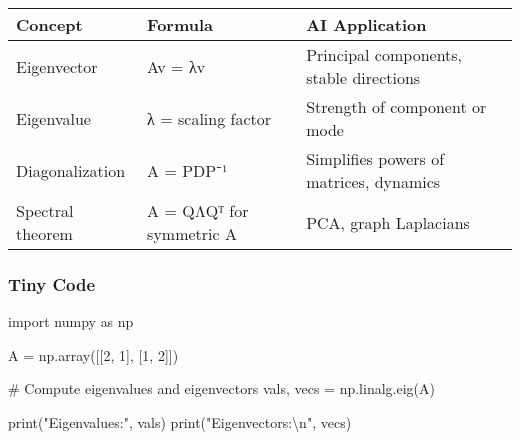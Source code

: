 \documentclass[
  letterpaper,
  DIV=11,
  numbers=noendperiod]{scrreprt}
\newenvironment{Shaded}{\begin{snugshade}}{\end{snugshade}}
\newcommand{\BuiltInTok}[1]{\textcolor[rgb]{0.00,0.23,0.31}{#1}}
\newcommand{\CharTok}[1]{\textcolor[rgb]{0.13,0.47,0.30}{#1}}
\newcommand{\CommentTok}[1]{\textcolor[rgb]{0.37,0.37,0.37}{#1}}
\newcommand{\DecValTok}[1]{\textcolor[rgb]{0.68,0.00,0.00}{#1}}
\newcommand{\ImportTok}[1]{\textcolor[rgb]{0.00,0.46,0.62}{#1}}
\newcommand{\NormalTok}[1]{\textcolor[rgb]{0.00,0.23,0.31}{#1}}
\newcommand{\OperatorTok}[1]{\textcolor[rgb]{0.37,0.37,0.37}{#1}}
\newcommand{\StringTok}[1]{\textcolor[rgb]{0.13,0.47,0.30}{#1}}
\begin{document}
\begin{longtable}[]{@{}
  >{\raggedright\arraybackslash}p{}
  >{\raggedright\arraybackslash}p{}
  >{\raggedright\arraybackslash}p{}@{}}
\toprule\noalign{}
\begin{minipage}[b]{\linewidth}\raggedright
Concept
\end{minipage} & \begin{minipage}[b]{\linewidth}\raggedright
Formula
\end{minipage} & \begin{minipage}[b]{\linewidth}\raggedright
AI Application
\end{minipage} \\
\midrule\noalign{}
\endhead
\bottomrule\noalign{}
\endlastfoot
Eigenvector & Av = λv & Principal components, stable directions \\
Eigenvalue & λ = scaling factor & Strength of component or mode \\
Diagonalization & A = PDP⁻¹ & Simplifies powers of matrices, dynamics \\
Spectral theorem & A = QΛQᵀ for symmetric A & PCA, graph Laplacians \\
\end{longtable}

\subsubsection{Tiny Code}\label{tiny-code-106}

\begin{Shaded}
\begin{Highlighting}[]
\ImportTok{import}\NormalTok{ numpy }\ImportTok{as}\NormalTok{ np}

\NormalTok{A }\OperatorTok{=}\NormalTok{ np.array([[}\DecValTok{2}\NormalTok{, }\DecValTok{1}\NormalTok{],}
\NormalTok{              [}\DecValTok{1}\NormalTok{, }\DecValTok{2}\NormalTok{]])}

\CommentTok{\# Compute eigenvalues and eigenvectors}
\NormalTok{vals, vecs }\OperatorTok{=}\NormalTok{ np.linalg.eig(A)}

\BuiltInTok{print}\NormalTok{(}\StringTok{"Eigenvalues:"}\NormalTok{, vals)}
\BuiltInTok{print}\NormalTok{(}\StringTok{"Eigenvectors:}\CharTok{\textbackslash{}n}\StringTok{"}\NormalTok{, vecs)}
\end{Highlighting}
\end{Shaded}
\end{document}
